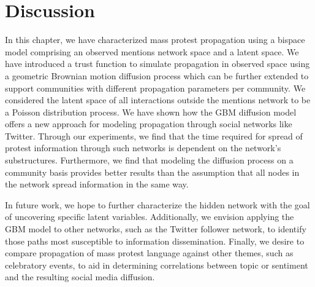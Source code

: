 
\section{Discussion}
In this chapter, we have characterized mass protest propagation using a
bispace model comprising an observed mentions network space and a latent space. We have introduced a trust function to simulate propagation in observed space using a geometric Brownian motion diffusion process which can be further extended to support communities with different propagation parameters per community. We
considered the latent space of all interactions outside the mentions network to be a Poisson distribution process. We have shown how the GBM diffusion model offers a new approach for modeling propagation through social networks like Twitter. Through our experiments, we find that the time required for spread of protest information through such networks is dependent on the network's substructures. Furthermore, we find that modeling the diffusion process on a community basis provides better results than the assumption that all nodes in the network spread information in the same way.

In future work, we hope to further characterize the hidden network with the goal of uncovering specific latent variables. Additionally, we envision applying the GBM model to other networks, such as the Twitter follower network, to identify those paths most susceptible to information dissemination. Finally, we desire
to compare propagation of mass protest language against other themes,
such as celebratory events, to aid in determining correlations
between topic or sentiment and the resulting social media diffusion.


